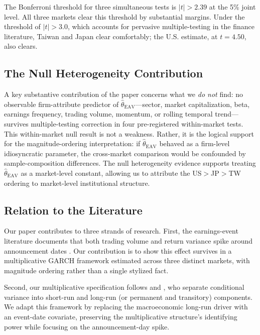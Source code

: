 \documentclass[12pt,a4paper]{article}
\begin{document}
The Bonferroni threshold for three simultaneous tests is $|t| > 2.39$ at the
5\% joint level. All three markets clear this threshold by substantial margins.
Under the \citet{harvey2016} threshold of $|t| > 3.0$, which accounts for
pervasive multiple-testing in the finance literature, Taiwan and Japan clear
comfortably; the U.S. estimate, at $t = 4.50$, also clears.

\subsection*{The Null Heterogeneity Contribution}

A key substantive contribution of the paper concerns what we \emph{do not} find:
no observable firm-attribute predictor of $\hat{\theta}_{\mathrm{EAV}}$---sector,
market capitalization, beta, earnings frequency, trading volume, momentum, or
rolling temporal trend---survives multiple-testing correction in four
pre-registered within-market tests. This within-market
null result is not a weakness. Rather, it is the logical support for the
magnitude-ordering interpretation: if $\hat{\theta}_{\mathrm{EAV}}$ behaved as
a firm-level idiosyncratic parameter, the cross-market comparison would be
confounded by sample-composition differences. The null heterogeneity evidence
supports treating $\hat{\theta}_{\mathrm{EAV}}$ as a market-level constant,
allowing us to attribute the US$>$JP$>$TW ordering to market-level institutional
structure.

\subsection*{Relation to the Literature}

Our paper contributes to three strands of research. First, the earnings-event
literature documents that both trading volume and return variance spike around
announcement dates \citep{beaver1968, patell1976, patell_wolfson1979,
ball_kothari1991}. Our contribution is to show this effect survives in a
multiplicative GARCH framework estimated across three distinct markets, with
magnitude ordering rather than a single stylized fact.

Second, our multiplicative specification follows \citet{engle_rangel2008} and
\citet{engle2013}, who separate conditional variance into short-run and long-run
(or permanent and transitory) components. We adapt this framework by replacing
the macroeconomic long-run driver with an event-date covariate, preserving the
multiplicative structure's identifying power while focusing on the
announcement-day spike.
\end{document}
